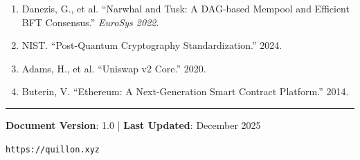 \documentclass[11pt,a4paper]{article}
\begin{document}
\begin{enumerate}[leftmargin=*]
    \item Danezis, G., et al. ``Narwhal and Tusk: A DAG-based Mempool and Efficient BFT Consensus.'' \textit{EuroSys 2022}.
    \item NIST. ``Post-Quantum Cryptography Standardization.'' 2024.
    \item Adams, H., et al. ``Uniswap v2 Core.'' 2020.
    \item Buterin, V. ``Ethereum: A Next-Generation Smart Contract Platform.'' 2014.
\end{enumerate}

\vfill

\begin{center}
\rule{0.5\textwidth}{0.4pt}

\textbf{Document Version}: 1.0 \quad | \quad \textbf{Last Updated}: December 2025

\texttt{https://quillon.xyz}
\end{center}
\end{document}
